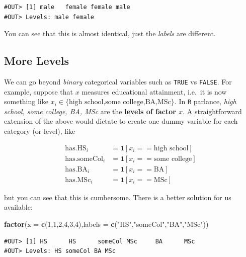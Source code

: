 \documentclass[]{book}
\newenvironment{Shaded}{\begin{snugshade}}{\end{snugshade}}
\newcommand{\KeywordTok}[1]{\textcolor[rgb]{0.13,0.29,0.53}{\textbf{#1}}}
\newcommand{\DataTypeTok}[1]{\textcolor[rgb]{0.13,0.29,0.53}{#1}}
\newcommand{\DecValTok}[1]{\textcolor[rgb]{0.00,0.00,0.81}{#1}}
\newcommand{\StringTok}[1]{\textcolor[rgb]{0.31,0.60,0.02}{#1}}
\newcommand{\NormalTok}[1]{#1}
\theoremstyle{definition}
\theoremstyle{definition}
\theoremstyle{definition}
\theoremstyle{remark}
\begin{document}
\begin{verbatim}
#OUT> [1] male   female female male  
#OUT> Levels: male female
\end{verbatim}

You can see that this is almost identical, just the \emph{labels} are
different.

\subsection{More Levels}\label{more-levels}

We can go beyond \emph{binary} categorical variables such as
\texttt{TRUE} vs \texttt{FALSE}. For example, suppose that \(x\)
measures educational attainment, i.e.~it is now something like
\(x_i \in \{\text{high school,some college,BA,MSc}\}\). In \texttt{R}
parlance, \emph{high school, some college, BA, MSc} are the
\textbf{levels of factor \(x\)}. A straightforward extension of the
above would dictate to create one dummy variable for each category (or
level), like

\begin{align*}
\text{has.HS}_i &= \mathbf{1}[x_i==\text{high school}] \\
\text{has.someCol}_i &= \mathbf{1}[x_i==\text{some college}] \\
\text{has.BA}_i &= \mathbf{1}[x_i==\text{BA}] \\
\text{has.MSc}_i &= \mathbf{1}[x_i==\text{MSc}] 
\end{align*}

but you can see that this is cumbersome. There is a better solution for
us available:

\begin{Shaded}
\begin{Highlighting}[]
\KeywordTok{factor}\NormalTok{(}\DataTypeTok{x =} \KeywordTok{c}\NormalTok{(}\DecValTok{1}\NormalTok{,}\DecValTok{1}\NormalTok{,}\DecValTok{2}\NormalTok{,}\DecValTok{4}\NormalTok{,}\DecValTok{3}\NormalTok{,}\DecValTok{4}\NormalTok{),}\DataTypeTok{labels =} \KeywordTok{c}\NormalTok{(}\StringTok{"HS"}\NormalTok{,}\StringTok{"someCol"}\NormalTok{,}\StringTok{"BA"}\NormalTok{,}\StringTok{"MSc"}\NormalTok{))}
\end{Highlighting}
\end{Shaded}

\begin{verbatim}
#OUT> [1] HS      HS      someCol MSc     BA      MSc    
#OUT> Levels: HS someCol BA MSc
\end{verbatim}
\end{document}
